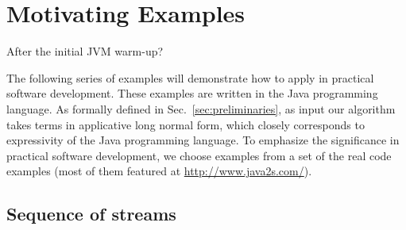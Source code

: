 \section{Motivating Examples}
\label{sec:examples}

After the initial JVM warm-up?  

The following series of examples will demonstrate how to apply \ourTool in practical software
development. These examples are written in the Java programming
language. As formally defined in Sec.~\ref{sec:preliminaries},
as input our algorithm takes terms in applicative long normal
form, which closely corresponds to expressivity of the Java programming language.
To emphasize the significance in practical software development, 
we choose examples from a set of the real code examples (most of them featured at
\url{http://www.java2s.com/}{}).

%
%


\subsection{Sequence of streams}

